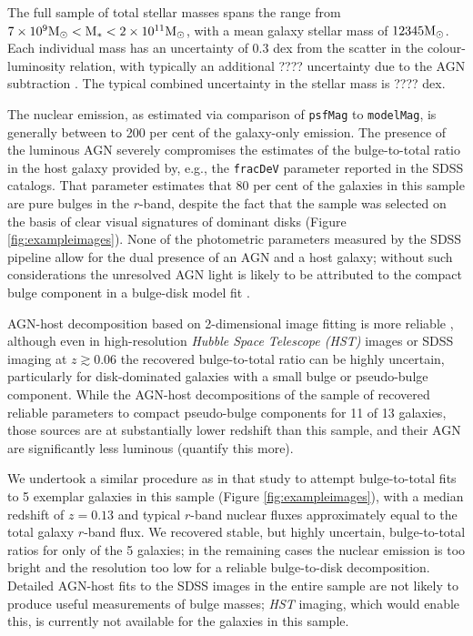The full sample of total stellar masses spans the range from {\notebsm $7 \times 10^9 \rm{M}_{\odot} < M_* < 2 \times 10^{11} \rm{M}_{\odot} $}, with a mean galaxy stellar mass of {\notebsm $12345 \rm{M}_{\odot} $}. Each individual mass has an uncertainty of {\notebsm $0.3$ dex} from the scatter in the colour-luminosity relation, with typically an additional {\notebsm ????} uncertainty due to the AGN subtraction \citep[dependent on the nuclear luminosity, e.g.][]{simmons08}. The typical combined uncertainty in the stellar mass is {\notebsm ????} dex.

The nuclear emission, as estimated via comparison of {\tt psfMag} to {\tt modelMag}, is generally between { to 200 per cent} of the galaxy-only emission. The presence of the luminous AGN severely compromises the estimates of the bulge-to-total ratio in the host galaxy provided by, e.g., the {\tt fracDeV} parameter reported in the SDSS catalogs. That parameter estimates that 80 per cent of the galaxies in this sample are pure \citet{devaucouleurs} bulges in the $r$-band, despite the fact that the sample was selected on the basis of clear visual signatures of dominant disks (Figure \ref{fig:exampleimages}). None of the photometric parameters measured by the SDSS pipeline allow for the dual presence of an AGN and a host galaxy; without such considerations the unresolved AGN light is likely to be attributed to the compact bulge component in a bulge-disk model fit \citep{simmons08,thatothersimspaper,koss11}.

AGN-host decomposition based on 2-dimensional image fitting \citep[e.g.,][]{peng02,peng10,gim2d} is more reliable \citep[e.g.][]{mclure99,urry00,mclure01,sanchez04,pierce07,gabor09,simmons11,simmons12b,simmons13,koss11,schawinski12}, although even in high-resolution \emph{Hubble Space Telescope (HST)} images \citep{simmons08,thatothersimspaper} or SDSS imaging at $z \gtrsim 0.06$ \citep{koss11,simmons13} the recovered bulge-to-total ratio can be highly uncertain, particularly for disk-dominated galaxies with a small bulge or pseudo-bulge component. While the AGN-host decompositions of the sample of \citet{simmons13} recovered reliable parameters to compact pseudo-bulge components for 11 of 13 galaxies, those sources are at substantially lower redshift than this sample, and their AGN are significantly less luminous {\notebsm (quantify this more)}. 

We undertook a similar procedure as in that study to attempt bulge-to-total fits to 5 exemplar galaxies in this sample (Figure \ref{fig:exampleimages}), with a median redshift of {\notebsm $z = 0.13$} and typical $r$-band nuclear fluxes {\notebsm approximately equal to the total galaxy $r$-band flux}. We recovered stable, but highly uncertain, bulge-to-total ratios for only {} of the 5 galaxies; in the remaining cases the nuclear emission is too bright and the resolution too low for a reliable bulge-to-disk decomposition. Detailed AGN-host fits to the SDSS images in the entire sample are not likely to produce useful measurements of bulge masses; \emph{HST} imaging, which would enable this, is currently not available for the galaxies in this sample.

